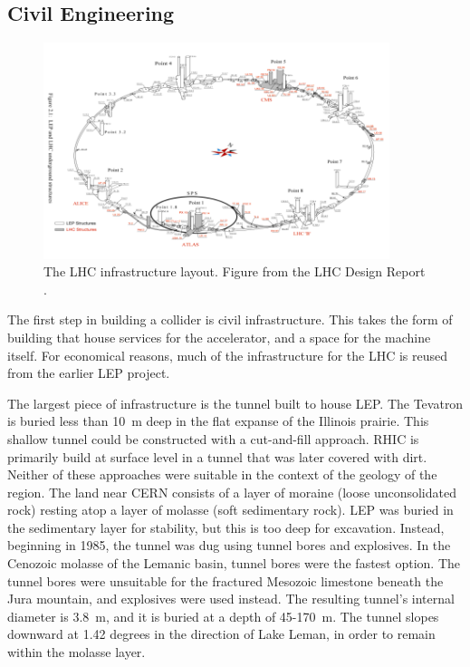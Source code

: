 \subsection{Civil Engineering}

\begin{figure}[h!]
\captionsetup[subfigure]{position=b}
\centering
\includegraphics[width=0.9\textwidth]{figures/experiment/lhcLepLayout.png}
\caption{The LHC infrastructure layout. Figure from the LHC Design Report \cite{lhcDesignV2}.}
\label{figure:lhcLayout}
\end{figure}


The first step in building a collider is civil infrastructure.
This takes the form of building that house services for the accelerator, and a space for the machine itself.
For economical reasons, much of the infrastructure for the LHC is reused from the earlier LEP project.

The largest piece of infrastructure is the tunnel built to house LEP.
The Tevatron is buried less than 10~m deep in the flat expanse of the Illinois prairie. This shallow tunnel could be constructed with a cut-and-fill approach.
RHIC is primarily build at surface level in a tunnel that was later covered with dirt.
Neither of these approaches were suitable in the context of the geology of the region.
The land near CERN consists of a layer of moraine (loose unconsolidated rock) resting atop a layer of molasse (soft sedimentary rock).
LEP was buried in the sedimentary layer for stability, but this is too deep for excavation.
Instead, beginning in 1985, the tunnel was dug using tunnel bores and explosives.
In the Cenozoic molasse of the Lemanic basin, tunnel bores were the fastest option.
The tunnel bores were unsuitable for the fractured Mesozoic limestone beneath the Jura mountain, and explosives were used instead.
The resulting tunnel's internal diameter is 3.8~m, and it is buried at a depth of 45-170~m.
The tunnel slopes downward at 1.42 degrees in the direction of Lake Leman, in order to remain within the molasse layer.

